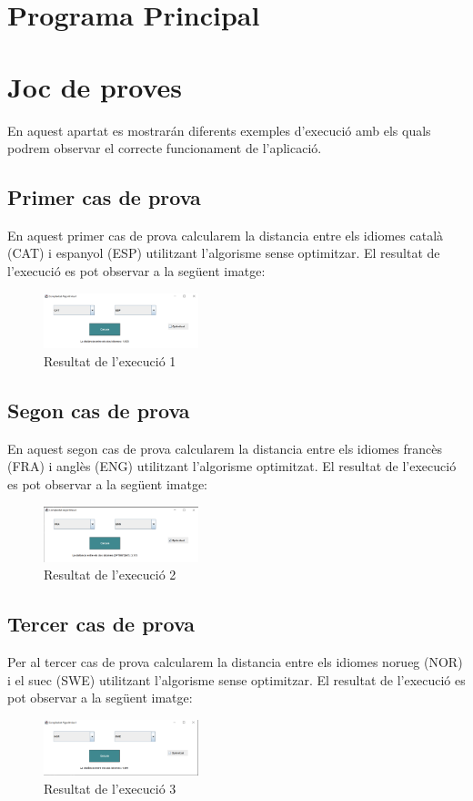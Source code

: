 \documentclass[conference]{IEEEtran}
\begin{document}
\section{Programa Principal}


\section{Joc de proves}
En aquest apartat es mostrarán diferents exemples d'execució amb els quals podrem observar el correcte funcionament de l'aplicació.
\subsection{Primer cas de prova}
En aquest primer cas de prova calcularem la distancia entre els idiomes català (CAT) i espanyol (ESP) utilitzant l'algorisme sense optimitzar. El resultat de l'execució es pot observar a la següent imatge:
\begin{figure}[ht]
    \centering
    \includegraphics[width=0.4\textwidth]{images/execucio1.png}
    \caption{Resultat de l'execució 1}
\end{figure}

\subsection{Segon cas de prova}
En aquest segon cas de prova calcularem la distancia entre els idiomes francès (FRA) i anglès (ENG) utilitzant l'algorisme optimitzat. El resultat de l'execució es pot observar a la següent imatge:
\begin{figure}[ht]
    \centering
    \includegraphics[width=0.4\textwidth]{images/execucio2.png}
    \caption{Resultat de l'execució 2}
\end{figure}
\subsection{Tercer cas de prova}
Per al tercer cas de prova calcularem la distancia entre els idiomes norueg (NOR) i el suec (SWE) utilitzant l'algorisme sense optimitzar. El resultat de l'execució es pot observar a la següent imatge:
\begin{figure}[ht]
    \centering
    \includegraphics[width=0.4\textwidth]{images/execucio3.png}
    \caption{Resultat de l'execució 3}
\end{figure}
\end{document}
